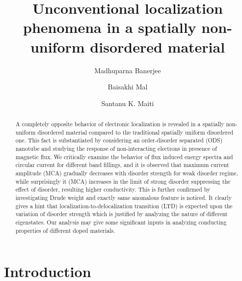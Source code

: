 \documentclass[prb,aps,twocolumn,amsmath,amssymb,floatfix,
superscriptaddress]{revtex4}
\begin{document}
\title{Unconventional localization phenomena in a spatially non-uniform 
disordered material}

\author{Madhuparna Banerjee}


\author{Baisakhi Mal}


\author{Santanu K. Maiti}



\begin{abstract}

A completely opposite behavior of electronic localization is revealed in a 
spatially non-uniform disordered material compared to the traditional 
spatially uniform disordered one. This fact is substantiated by considering 
an order-disorder separated (ODS) nanotube and studying the response of 
non-interacting electrons in presence of magnetic flux. We 
critically examine the behavior of flux induced energy spectra and circular 
current for different band fillings, and it is observed that maximum current 
amplitude (MCA) gradually decreases with disorder strength for weak disorder 
regime, while surprisingly it (MCA) increases in the limit of strong disorder 
suppressing the effect of disorder, resulting higher conductivity. This is 
further confirmed by investigating Drude weight and exactly same anomalous 
feature is noticed. It clearly gives a hint that localization-to-delocalization 
transition (LTD) is expected upon the variation of disorder strength which 
is justified by analyzing the nature of different eigenstates. Our analysis 
may give some significant inputs in analyzing conducting properties of 
different doped materials.

\end{abstract}

\maketitle

\section{Introduction}
\end{document}
